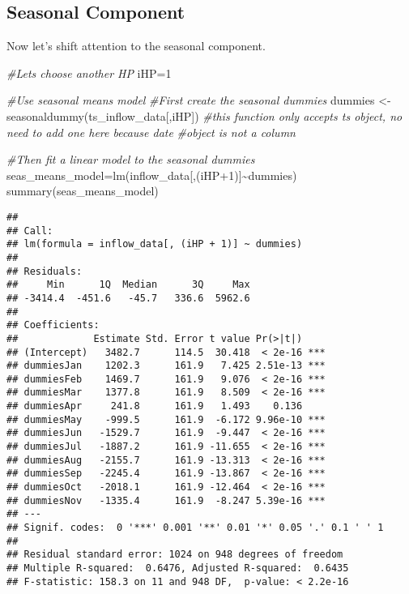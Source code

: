 \documentclass[
]{article}
\newenvironment{Shaded}{\begin{snugshade}}{\end{snugshade}}
\newcommand{\CommentTok}[1]{\textcolor[rgb]{0.56,0.35,0.01}{\textit{#1}}}
\newcommand{\DecValTok}[1]{\textcolor[rgb]{0.00,0.00,0.81}{#1}}
\newcommand{\FunctionTok}[1]{\textcolor[rgb]{0.00,0.00,0.00}{#1}}
\newcommand{\NormalTok}[1]{#1}
\newcommand{\OtherTok}[1]{\textcolor[rgb]{0.56,0.35,0.01}{#1}}
\newcommand{\SpecialCharTok}[1]{\textcolor[rgb]{0.00,0.00,0.00}{#1}}
\begin{document}
\hypertarget{seasonal-component}{%
\subsection{Seasonal Component}\label{seasonal-component}}

Now let's shift attention to the seasonal component.

\begin{Shaded}
\begin{Highlighting}[]
\CommentTok{\#Let\textquotesingle{}s choose another HP}
\NormalTok{iHP}\OtherTok{=}\DecValTok{1} 

\CommentTok{\#Use seasonal means model}
\CommentTok{\#First create the seasonal dummies}
\NormalTok{dummies }\OtherTok{\textless{}{-}} \FunctionTok{seasonaldummy}\NormalTok{(ts\_inflow\_data[,iHP])  }
\CommentTok{\#this function only accepts ts object, no need to add one here because date }
\CommentTok{\#object is not a column}

\CommentTok{\#Then fit a linear model to the seasonal dummies}
\NormalTok{seas\_means\_model}\OtherTok{=}\FunctionTok{lm}\NormalTok{(inflow\_data[,(iHP}\SpecialCharTok{+}\DecValTok{1}\NormalTok{)]}\SpecialCharTok{\textasciitilde{}}\NormalTok{dummies)}
\FunctionTok{summary}\NormalTok{(seas\_means\_model)}
\end{Highlighting}
\end{Shaded}

\begin{verbatim}
## 
## Call:
## lm(formula = inflow_data[, (iHP + 1)] ~ dummies)
## 
## Residuals:
##     Min      1Q  Median      3Q     Max 
## -3414.4  -451.6   -45.7   336.6  5962.6 
## 
## Coefficients:
##             Estimate Std. Error t value Pr(>|t|)    
## (Intercept)   3482.7      114.5  30.418  < 2e-16 ***
## dummiesJan    1202.3      161.9   7.425 2.51e-13 ***
## dummiesFeb    1469.7      161.9   9.076  < 2e-16 ***
## dummiesMar    1377.8      161.9   8.509  < 2e-16 ***
## dummiesApr     241.8      161.9   1.493    0.136    
## dummiesMay    -999.5      161.9  -6.172 9.96e-10 ***
## dummiesJun   -1529.7      161.9  -9.447  < 2e-16 ***
## dummiesJul   -1887.2      161.9 -11.655  < 2e-16 ***
## dummiesAug   -2155.7      161.9 -13.313  < 2e-16 ***
## dummiesSep   -2245.4      161.9 -13.867  < 2e-16 ***
## dummiesOct   -2018.1      161.9 -12.464  < 2e-16 ***
## dummiesNov   -1335.4      161.9  -8.247 5.39e-16 ***
## ---
## Signif. codes:  0 '***' 0.001 '**' 0.01 '*' 0.05 '.' 0.1 ' ' 1
## 
## Residual standard error: 1024 on 948 degrees of freedom
## Multiple R-squared:  0.6476, Adjusted R-squared:  0.6435 
## F-statistic: 158.3 on 11 and 948 DF,  p-value: < 2.2e-16
\end{verbatim}
\end{document}
